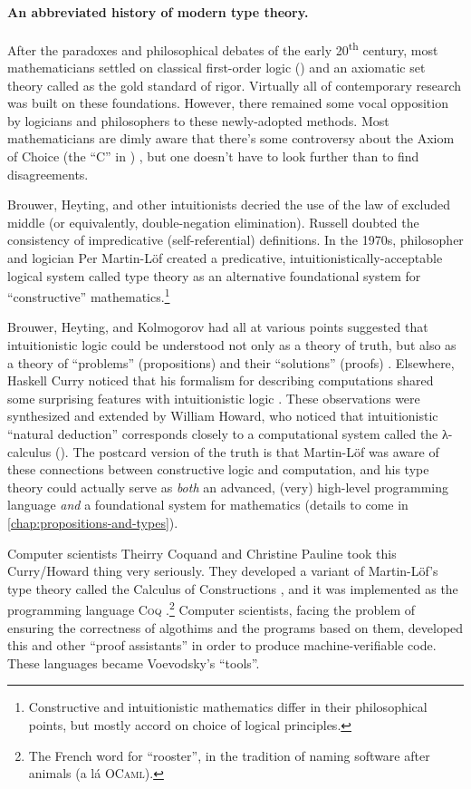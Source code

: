 \documentclass[12pt,twoside]{reedthesis}
\let\oldindex\index
\renewcommand{\index}[1]
               {\oldindex{#1}\marginpar{\footnotesize\color{index}index: #1}}
\newcommand{\indeX}{\oldindex}
\newcommand{\indeX}{\index}
\newcommand{\software}[1]{{\textsc{#1}}\indeX{#1}}
\newcommand{\Coq}{\software{Coq}}
\begin{document}
\paragraph{An abbreviated history of modern type theory.} After the paradoxes
and philosophical debates of the early 20\textsuperscript{th} century, most
mathematicians settled on classical first-order logic (\FOL{}) and an axiomatic
set theory called \ZFC{} as the gold standard of rigor. Virtually all of
contemporary research was built on these foundations. However, there remained
some vocal opposition by logicians and philosophers to these newly-adopted
methods. Most mathematicians are dimly aware that there's some controversy about
the Axiom of Choice (the ``C'' in \ZFC{}) \cite{martin-lof-100-years}, but one
doesn't have to look further than \FOL{} to find disagreements.

Brouwer, Heyting, and other intuitionists decried the use of the law
of excluded middle (or equivalently, double-negation elimination). Russell
doubted the consistency of impredicative (self-referential) definitions.
In the 1970s, philosopher and logician Per Martin-Löf created a predicative,
intuitionistically-acceptable logical system called type theory as an
alternative foundational system for ``constructive''
mathematics.\footnote{Constructive and intuitionistic mathematics differ in
their philosophical points, but mostly accord on choice of logical principles.}

Brouwer, Heyting, and Kolmogorov had all at various points suggested that
intuitionistic logic could be understood not only as a theory of truth, but also
as a theory of ``problems'' (propositions) and their ``solutions'' (proofs)
\cite{kolmogorov}. Elsewhere, Haskell Curry noticed that his formalism for
describing computations shared some surprising features with intuitionistic
logic \cite{curry-howard}. These observations were synthesized and extended by
William Howard, who noticed that intuitionistic ``natural deduction''
corresponds closely to a computational system called the λ-calculus (\LC{}).
The postcard version of the truth is that Martin-Löf was aware of these
connections between constructive logic and computation, and his type theory
could actually serve as \textit{both} an advanced, (very) high-level programming
language \textit{and} a foundational system for mathematics (details to come in
\cref{chap:propositions-and-types}).

Computer scientists Theirry Coquand and Christine Pauline took this Curry/Howard
thing very seriously. They developed a variant of Martin-Löf's type theory called
the Calculus of Constructions \cite{coquand}, and it was implemented as the
programming language \Coq{} \cite{coq-manual}.\footnote{The French word for
``rooster'', in the tradition of naming software after animals (a lá
\software{OCaml}).} Computer scientists, facing the problem of ensuring the
correctness of algothims and the programs based on them, developed this and
other ``proof assistants'' in order to produce machine-verifiable code. These
languages became Voevodsky's ``tools''.
\end{document}

